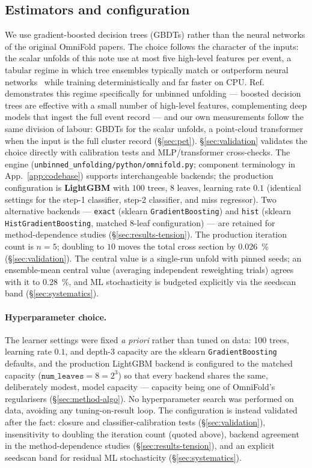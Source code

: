\subsection{Estimators and configuration}
\label{sec:method-config}



We use gradient-boosted decision trees (GBDTs) rather than the neural networks
of the original OmniFold papers. The choice follows the character of the
inputs: the scalar unfolds of this note use at most five high-level features
per event, a tabular regime in which tree ensembles typically match or
outperform neural networks~\cite{Grinsztajn:2022tabular} while training
deterministically and far faster on CPU. Ref.~\cite{Milton:2025tools}
demonstrates this regime specifically for unbinned unfolding --- boosted
decision trees are effective with a small number of high-level features,
complementing deep models that ingest the full event record --- and our own
measurements follow the same division of labour: GBDTs for the scalar
unfolds, a point-cloud transformer when the input is the full cluster record
(\S\ref{sec:pet}). \S\ref{sec:validation} validates the choice directly with
calibration tests and MLP/transformer cross-checks. The engine
(\texttt{unbinned\_unfolding/python/omnifold.py}; component terminology in
App.~\ref{app:codebase}) supports interchangeable
backends; the production configuration is \textbf{LightGBM} with
$100$ trees, $8$ leaves, learning rate $0.1$ (identical settings for the
step-1 classifier, step-2 classifier, and miss regressor). Two alternative
backends --- \texttt{exact} (sklearn \texttt{GradientBoosting}) and
\texttt{hist} (sklearn \texttt{HistGradientBoosting}, matched 8-leaf
configuration) --- are retained for method-dependence studies
(\S\ref{sec:results-tension}). The production iteration count is
$n=5$; doubling to $10$ moves the total cross section by
\SI{0.026}{\percent} (\S\ref{sec:validation}). The central value is a
single-run unfold with pinned seeds; an ensemble-mean central value (averaging
independent reweighting trials) agrees with it to \SI{0.28}{\percent}, and ML
stochasticity is budgeted explicitly via the seedscan band
(\S\ref{sec:systematics}).

\paragraph{Hyperparameter choice.}
The learner settings were fixed \emph{a priori} rather than tuned on data:
100 trees, learning rate $0.1$, and depth-3 capacity are the sklearn
\texttt{GradientBoosting} defaults, and the production LightGBM backend is
configured to the matched capacity ($\texttt{num\_leaves}=8=2^{3}$) so that
every backend shares the same, deliberately modest, model capacity ---
capacity being one of OmniFold's regularisers (\S\ref{sec:method-algo}). No
hyperparameter search was performed on data, avoiding any tuning-on-result
loop. The configuration is instead validated after the fact: closure and
classifier-calibration tests (\S\ref{sec:validation}), insensitivity to
doubling the iteration count (quoted above), backend agreement in the
method-dependence studies (\S\ref{sec:results-tension}), and an explicit
seedscan band for residual ML stochasticity (\S\ref{sec:systematics}).



